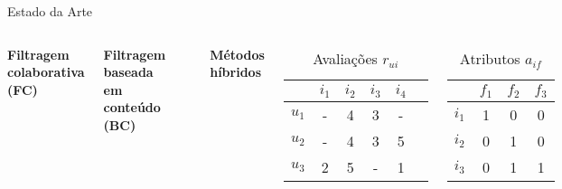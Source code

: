 \begin{frame}{Estado da Arte}{}
\begin{columns}[c]
\textbf{Filtragem colaborativa (FC)}


\textbf{Filtragem baseada em conteúdo (BC)}
\par{~}

\textbf{Métodos híbridos}



\begin{table}[hp]
\begin{center}
	\caption{Avaliações $r_{ui}$}
    \begin{tabular}{ | c | c | c | c | c | c |} 
    \hline
     & $i_1$ & $i_2$ & $i_3$ & $i_4$ \\ \hline
     $u_1$ & - & 4 & 3 & - \\ \hline
     $u_2$ & - & 4 & 3 & 5 \\ \hline
     $u_3$ & 2 & 5 & - & 1 \\ \hline
    \end{tabular}
\end{center}
\end{table}


\begin{table}[hp]
\begin{center}
    \caption{Atributos $a_{if}$}
    \begin{tabular}{ | c | c | c | c | } 
    \hline
     & $f_1$ & $f_2$ & $f_3$ \\ \hline
     $i_1$ & 1 & 0 & 0 \\ \hline
     $i_2$ & 0 & 1 & 0 \\ \hline
     $i_3$ & 0 & 1 & 1 \\ \hline
    \end{tabular}
\end{center}
\end{table}

\end{columns}
\end{frame}

